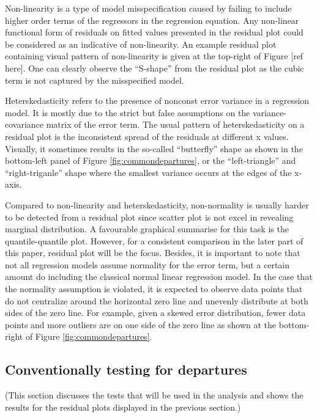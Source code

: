 \documentclass[]{interact}
\theoremstyle{plain}%
\theoremstyle{definition}
\theoremstyle{remark}
\begin{document}
Non-linearity is a type of model misspecification caused by failing to
include higher order terms of the regressors in the regression equation.
Any non-linear functional form of residuals on fitted values presented
in the residual plot could be considered as an indicative of
non-linearity. An example residual plot containing visual pattern of
non-linearity is given at the top-right of Figure {[}ref here{]}. One
can clearly observe the ``S-shape'' from the residual plot as the cubic
term is not captured by the misspecified model.

Heterskedasticity refers to the presence of nonconst error variance in a
regression model. It is mostly due to the strict but false assumptions
on the variance-covariance matrix of the error term. The usual pattern
of heterskedasticity on a residual plot is the inconsistent spread of
the residuals at different x values. Visually, it sometimes results in
the so-called ``butterfly'' shape as shown in the bottom-left panel of
Figure \ref{fig:commondepartures}, or the ``left-triangle'' and
``right-triganle'' shape where the smallest variance occurs at the edges
of the x-axis.

Compared to non-linearity and heterskedasticity, non-normality is
usually harder to be detected from a residual plot since scatter plot is
not excel in revealing marginal distribution. A favourable graphical
summarise for this task is the quantile-quantile plot. However, for a
consistent comparison in the later part of this paper, residual plot
will be the focus. Besides, it is important to note that not all
regression models assume normality for the error term, but a certain
amount do including the classical normal linear regression model. In the
case that the normality assumption is violated, it is expected to
observe data points that do not centralize around the horizontal zero
line and unevenly distribute at both sides of the zero line. For
example, given a skewed error distribution, fewer data points and more
outliers are on one side of the zero line as shown at the bottom-right
of Figure \ref{fig:commondepartures}.

\hypertarget{conventionally-testing-for-departures}{%
\subsection{Conventionally testing for
departures}\label{conventionally-testing-for-departures}}

(This section discusses the tests that will be used in the analysis and
shows the results for the residual plots displayed in the previous
section.)
\end{document}
